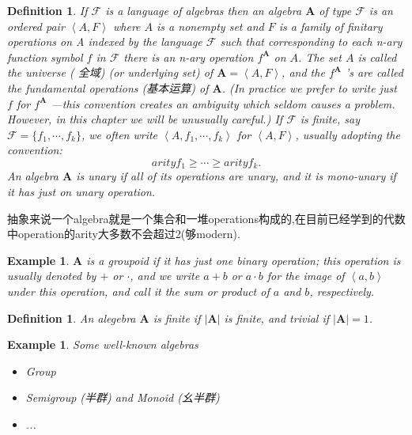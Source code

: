 \documentclass{article}
\newtheorem{example}[theorem]{Example}
\newtheorem{definition}[theorem]{Definition}
\begin{document}
\begin{definition}
\rm If $\mathcal{F}$ is a language of algebras then an {\color{red} algebra} $\mathbf{A}$ of type $\mathcal{F}$ is an ordered pair $\left<A,F\right>$ where $A$ is a nonempty set and $F$ is a family of finitary operations on A indexed by the language $\mathcal{F}$ such that corresponding to each n-ary function symbol $f$ in $\mathcal{F}$ there is an n-ary operation $f^\mathbf{A}$ on $A$. The set $A$ is called the {\color{red} universe} ({\color{blue} 全域}) (or underlying set) of $\mathbf{A} =\left<A,F\right>$, and the $f^\mathbf{A}$ ’s are called the {\color{red} fundamental operations} ({\color{blue}基本运算}) of $\mathbf{A}$. (In practice we prefer to write just $f$ for $f ^\mathbf{A}$ —this convention creates an ambiguity which seldom causes a problem. However, in this chapter we will be unusually careful.) If $\mathcal{F}$ is finite, say $\mathcal{F} = \{f_1,\cdots,f_k\}$, we often write $\left<A, f_1,\cdots,f_k\right>$ for $\left<A,F\right>$, usually adopting the convention:
$$
arity f_1 \geq \cdots \geq arity f_k.
$$
An algebra $\mathbf{A}$ is {\color{red} unary} if all of its operations are unary, and it is mono-unary if it has just on unary operation.
\end{definition}

{\color{blue} 抽象来说一个algebra就是一个集合和一堆operations构成的,在目前已经学到的代数中operation的arity大多数不会超过2(够modern).}

\begin{example}
\rm $\mathbf{A}$ is a {\color{red} groupoid} if it has just one binary operation; this operation is usually denoted by $+$ or $\cdot$, and we write $a+b$ or $a \cdot b$ for the image of $\left<a,b\right>$ under this operation, and call it the sum or product of $a$ and $b$, respectively.
\end{example}

\begin{definition}
\rm An alegebra $\mathbf{A}$ is {\color{red} finite} if $|\mathbf{A}|$ is finite, and trivial if $|\mathbf{A}|=1$. 
\end{definition}

\begin{example}
\rm Some well-known algebras
\begin{itemize}
	\item Group
	\item Semigroup (半群) and Monoid (幺半群)
	\item ...
\end{itemize}
\end{example}
\end{document}
